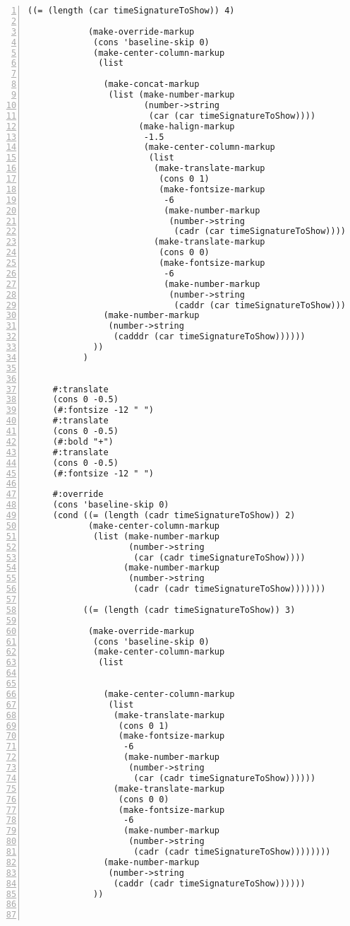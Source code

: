 \begin{Verbatim}[numbers=left,xleftmargin=5mm]
           ((= (length (car timeSignatureToShow)) 4)

            (make-override-markup
             (cons 'baseline-skip 0)
             (make-center-column-markup
              (list

               (make-concat-markup
                (list (make-number-markup
                       (number->string
                        (car (car timeSignatureToShow))))
                      (make-halign-markup
                       -1.5
                       (make-center-column-markup
                        (list
                         (make-translate-markup
                          (cons 0 1)
                          (make-fontsize-markup
                           -6
                           (make-number-markup
                            (number->string
                             (cadr (car timeSignatureToShow))))))
                         (make-translate-markup
                          (cons 0 0)
                          (make-fontsize-markup
                           -6
                           (make-number-markup
                            (number->string
                             (caddr (car timeSignatureToShow)))))))))))
               (make-number-markup
                (number->string
                 (cadddr (car timeSignatureToShow))))))
             ))
           )


     #:translate
     (cons 0 -0.5)
     (#:fontsize -12 " ")
     #:translate
     (cons 0 -0.5)
     (#:bold "+")
     #:translate
     (cons 0 -0.5)
     (#:fontsize -12 " ")

     #:override
     (cons 'baseline-skip 0)
     (cond ((= (length (cadr timeSignatureToShow)) 2)
            (make-center-column-markup
             (list (make-number-markup
                    (number->string
                     (car (cadr timeSignatureToShow))))
                   (make-number-markup
                    (number->string
                     (cadr (cadr timeSignatureToShow)))))))

           ((= (length (cadr timeSignatureToShow)) 3)

            (make-override-markup
             (cons 'baseline-skip 0)
             (make-center-column-markup
              (list


               (make-center-column-markup
                (list
                 (make-translate-markup
                  (cons 0 1)
                  (make-fontsize-markup
                   -6
                   (make-number-markup
                    (number->string
                     (car (cadr timeSignatureToShow))))))
                 (make-translate-markup
                  (cons 0 0)
                  (make-fontsize-markup
                   -6
                   (make-number-markup
                    (number->string
                     (cadr (cadr timeSignatureToShow))))))))
               (make-number-markup
                (number->string
                 (caddr (cadr timeSignatureToShow))))))
             ))



\end{Verbatim}
